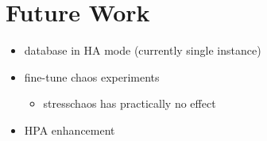 \chapter{Future Work} \label{future-work}

\begin{itemize}
	\item database in HA mode (currently single instance)
	\item fine-tune chaos experiments
	\begin{itemize}
		\item stresschaos has practically no effect
	\end{itemize}
	\item HPA enhancement
\end{itemize}
